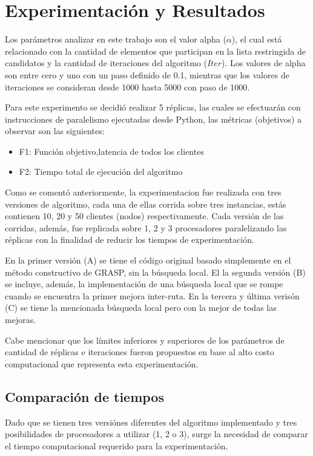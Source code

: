 \documentclass[review]{elsarticle}
\begin{document}
\section{Experimentaci\'on y Resultados
}
Los par\'ametros analizar en este trabajo son el valor alpha ($\alpha$), el cual est\'a relacionado con la cantidad de elementos que participan en la lista restringida de candidatos  y la cantidad de iteraciones del algoritmo ($Iter$). Los valores de alpha son entre cero y uno con un paso definido de 0.1, mientras que los valores de iteraciones se consideran desde 1000 hasta 5000 con paso de 1000. 

Para este experimento se decidi\'o realizar 5 réplicas, las cuales se efectuar\'an con instrucciones de paralelismo ejecutadas desde Python, las m\'etricas (objetivos) a observar son las siguientes:

\begin{itemize}
\item F1: Funci\'on objetivo,latencia de todos los clientes
\item F2: Tiempo total de ejecuci\'on del algoritmo 
\end{itemize}

Como se comentó anteriormente, la experimentacion fue realizada con tres versiones de algoritmo, cada una de ellas corrida sobre tres instancias, estás  contienen 10, 20 y 50 clientes (nodos) respectivamente. Cada versión de las corridas, además, fue replicada sobre 1, 2 y 3 procesadores paralelizando las réplicas con la finalidad de reducir los tiempos de experimentación.

En la primer versión (A) se tiene el código original basado simplemente en el método constructivo de GRASP, sin la búsqueda local. El la segunda versión (B) se incluye, además, la implementación de una búsqueda local que se rompe cuando se encuentra la primer mejora inter-ruta. En la tercera y última verisón (C) se tiene la mencionada búsqueda local pero con la mejor de todas las mejoras. 

Cabe mencionar que los límites inferiores y superiores de los parámetros de cantidad de réplicas e iteraciones fueron propuestos en base al alto costo computacional que representa esta experimentación.

\subsection{Comparación de tiempos}

Dado que se tienen tres versiónes diferentes del algoritmo implementado y tres posibilidades de procesadores a utilizar (1, 2 o 3), surge la necesidad de comparar el tiempo computacional requerido para la experimentación.
\end{document}
